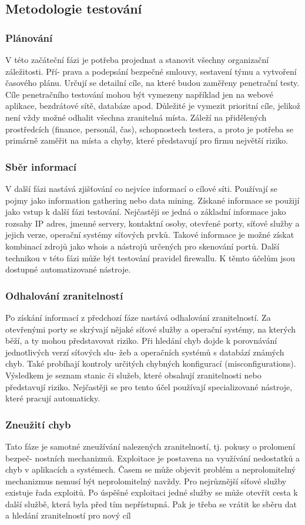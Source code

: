 \documentclass{article}
\begin{document}
\subsection{Metodologie testování}
\subsubsection{Plánování}
V této začáteční fázi je potřeba projednat a stanovit všechny organizační záležitosti. Pří-
prava a podepsání bezpečné smlouvy, sestavení týmu a vytvoření časového plánu.
Určují se detailní cíle, na které budou zaměřeny penetrační testy. Cíle penetračního
testování mohou být vymezeny například jen na webové aplikace, bezdrátové sítě, databáze
apod. Důležité je vymezit prioritní cíle, jelikož není vždy možné odhalit všechna zranitelná
místa. Záleží na přidělených prostředcích (finance, personál, čas), schopnostech testera, a
proto je potřeba se primárně zaměřit na místa a chyby, které představují pro firmu největší
riziko.
\subsubsection{ Sběr informací}
V další fázi nastává zjišťování co nejvíce informací o cílové síti. Používají se pojmy jako
information gathering nebo data mining. Získané informace se použijí jako vstup k další
fázi testování. Nejčastěji se jedná o základní informace jako rozsahy IP adres, jmenné
servery, kontaktní osoby, otevřené porty, síťové služby a jejich verze, operační systémy
síťových prvků. Takové informace je možné získat kombinací zdrojů jako whois a nástrojů
určených pro skenování portů. Další technikou v této fázi může být testování pravidel firewallu. K těmto účelům jsou dostupné automatizované nástroje.
\subsubsection{ Odhalování zranitelností}
Po získání informací z předchozí fáze nastává odhalování zranitelností. Za otevřenými
porty se skrývají nějaké síťové služby a operační systémy, na kterých běží, a ty mohou
představovat riziko. Při hledání chyb dojde k porovnávání jednotlivých verzí síťových slu-
žeb a operačních systémů s databází známých chyb. Také probíhají kontroly určitých chybných
konfigurací (misconfigurations). Výsledkem je seznam stanic či služeb, které obsahují
zranitelnosti nebo představují riziko. Nejčastěji se pro tento účel používají specializované
nástroje, které pracují automaticky.
\subsubsection{Zneužití chyb}
Tato fáze je samotné zneužívání nalezených zranitelností, tj. pokusy o prolomení bezpeč-
nostních mechanizmů. Exploitace je postavena na využívání nedostatků a chyb v aplikacích
a systémech. Časem se může objevit problém a neprolomitelný mechanizmus nemusí být
neprolomitelný navždy. Pro nejrůznější síťové služby existuje řada exploitů.
Po úspěšné exploitaci jedné služby se může otevřít cesta k další službě, která byla před
tím nepřístupná. Pak je třeba se vrátit ke sběru dat a hledání zranitelností pro nový cíl
\end{document}

